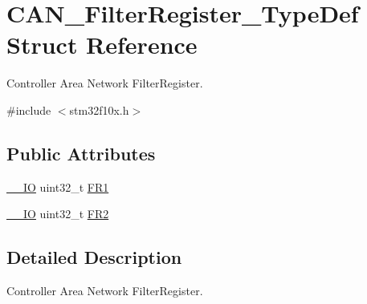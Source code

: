 \hypertarget{struct_c_a_n___filter_register___type_def}{\section{C\-A\-N\-\_\-\-Filter\-Register\-\_\-\-Type\-Def Struct Reference}
\label{struct_c_a_n___filter_register___type_def}
}


Controller Area Network Filter\-Register.  




{\ttfamily \#include $<$stm32f10x.\-h$>$}

\subsection*{Public Attributes}
\begin{DoxyCompactItemize}
\item 
\hyperlink{group___c_m_s_i_s__core__definitions_gaec43007d9998a0a0e01faede4133d6be}{\-\_\-\-\_\-\-I\-O} uint32\-\_\-t \hyperlink{struct_c_a_n___filter_register___type_def_ac9bc1e42212239d6830582bf0c696fc5}{F\-R1}
\item 
\hyperlink{group___c_m_s_i_s__core__definitions_gaec43007d9998a0a0e01faede4133d6be}{\-\_\-\-\_\-\-I\-O} uint32\-\_\-t \hyperlink{struct_c_a_n___filter_register___type_def_a77959e28a302b05829f6a1463be7f800}{F\-R2}
\end{DoxyCompactItemize}


\subsection{Detailed Description}
Controller Area Network Filter\-Register. 

